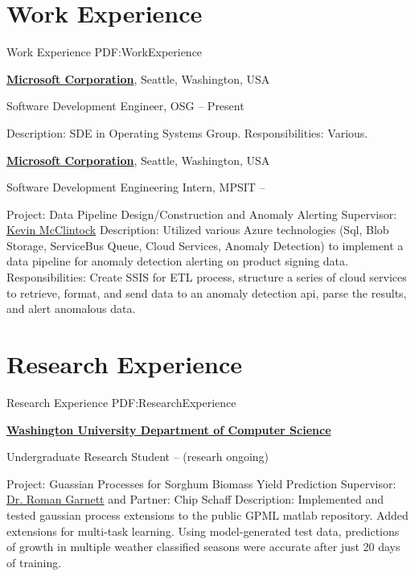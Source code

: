 \documentclass[a4paper,10pt,oneside]{article}
\begin{document}
\begin{body}

\section{Work Experience}
{Work Experience}
{PDF:WorkExperience}

\href{http://www.microsoft.com/en-us/default.aspx}
{\textbf{Microsoft Corporation}},
Seattle, Washington, USA
\par
Software Development Engineer, OSG
\hfill
{} -- Present
\begin{detail}
\BulletItem
Description:
SDE in Operating Systems Group.
\BulletItem
Responsibilities:
Various.
\end{detail}

\href{http://www.microsoft.com/en-us/default.aspx}
{\textbf{Microsoft Corporation}},
Seattle, Washington, USA
\par
Software Development Engineering Intern, MPSIT
\hfill
{} --
\begin{detail}
\BulletItem
Project:
Data Pipeline Design/Construction and Anomaly Alerting
\BulletItem
Supervisor:
\href{https://www.linkedin.com/pub/kevin-mcclintock/4/590/805}{Kevin McClintock}
\BulletItem
Description:
Utilized various Azure technologies (Sql, Blob Storage, ServiceBus Queue, Cloud Services, Anomaly Detection) to implement a data pipeline for anomaly detection alerting on product signing data.
\BulletItem
Responsibilities:
Create SSIS for ETL process, structure a series of cloud services to retrieve, format, and send data to an anomaly detection api, parse the results, and alert anomalous data.
\end{detail}



\section
{Research Experience}
{Research Experience}
{PDF:ResearchExperience}

\href{http://cse.wustl.edu/}
{\textbf{Washington University Department of Computer Science}}
\par
Undergraduate Research Student
\hfill
{} --
 (researh ongoing)
\begin{detail}
\BulletItem
Project:
Guassian Processes for Sorghum Biomass Yield Prediction
\BulletItem
Supervisor:
\href{http://www.cse.wustl.edu/~garnett/}{Dr. Roman Garnett} and Partner: Chip Schaff
\BulletItem
Description:
Implemented and tested gaussian process extensions to the public GPML matlab repository.  Added extensions for multi-task learning.  Using model-generated test data, predictions of growth in multiple weather classified seasons were accurate after just 20 days of training.
\end{detail}


\end{body}
\end{document}
